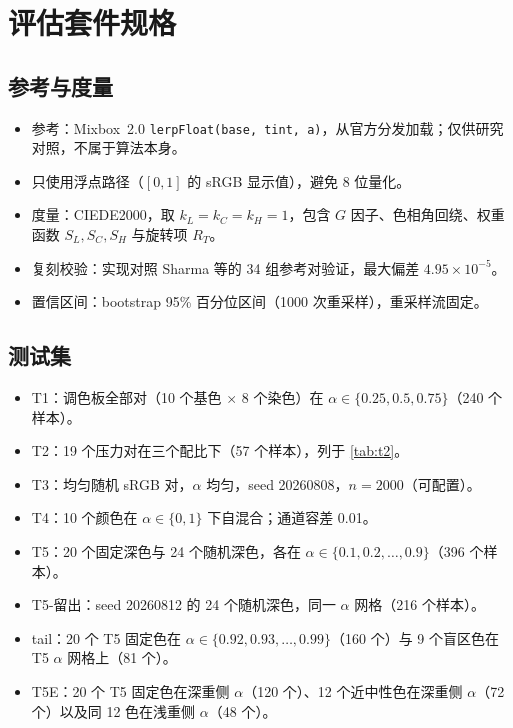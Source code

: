 \appendix

\section{评估套件规格}
\label{app:suite}

\subsection{参考与度量}
\begin{itemize}
\item 参考：Mixbox~2.0 \texttt{lerpFloat(base, tint, a)}，从官方分发加载；仅供研究对照，不属于算法本身。
\item 只使用浮点路径（$[0,1]$ 的 sRGB 显示值），避免 8 位量化。
\item 度量：CIEDE2000，取 $k_{L}=k_{C}=k_{H}=1$，包含 $G$ 因子、色相角回绕、权重函数 $S_{L},S_{C},S_{H}$ 与旋转项 $R_{T}$。
\item 复刻校验：实现对照 Sharma 等的 34 组参考对验证，最大偏差 $4.95\times10^{-5}$。
\item 置信区间：bootstrap 95\% 百分位区间（1000 次重采样），重采样流固定。
\end{itemize}

\subsection{测试集}
\begin{itemize}
\item T1：调色板全部对（10 个基色 $\times$ 8 个染色）在 $\alpha\in\{0.25,0.5,0.75\}$（240 个样本）。
\item T2：19 个压力对在三个配比下（57 个样本），列于 \cref{tab:t2}。
\item T3：均匀随机 sRGB 对，$\alpha$ 均匀，seed 20260808，$n=2000$（可配置）。
\item T4：10 个颜色在 $\alpha\in\{0,1\}$ 下自混合；通道容差 0.01。
\item T5：20 个固定深色与 24 个随机深色，各在 $\alpha\in\{0.1,0.2,\dots,0.9\}$（396 个样本）。
\item T5-留出：seed 20260812 的 24 个随机深色，同一 $\alpha$ 网格（216 个样本）。
\item tail：20 个 T5 固定色在 $\alpha\in\{0.92,0.93,\dots,0.99\}$（160 个）与 9 个盲区色在 T5 $\alpha$ 网格上（81 个）。
\item T5E：20 个 T5 固定色在深重侧 $\alpha$（120 个）、12 个近中性色在深重侧 $\alpha$（72 个）以及同 12 色在浅重侧 $\alpha$（48 个）。
\end{itemize}

